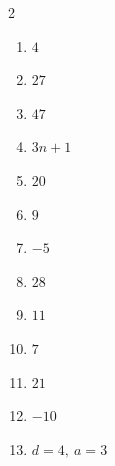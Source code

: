 \documentclass[11pt]{article}
\begin{document}
\begin{keybox}
\begin{multicols}{2}
\small
\begin{enumerate}[leftmargin=*,itemsep=3pt]
  \item $4$
  \item $27$
  \item $47$
  \item $3n+1$
  \item $20$
  \item $9$
  \item $-5$
  \item $28$
  \item $11$
  \item $7$
  \item $21$
  \item $-10$
  \item $d=4,\ a=3$
\end{enumerate}
\end{multicols}
\end{keybox}
\end{document}
